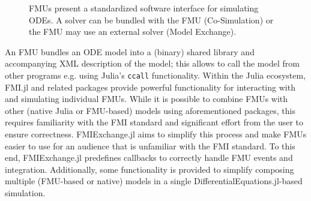 \documentclass{juliacon}
\begin{document}
\begin{figure}
  \center
{}
\caption{FMUs present a standardized software interface for simulating ODEs. A solver can be bundled with the FMU (Co-Simulation) or the FMU may use an external solver (Model Exchange).}
\label{fig:FMU}
\end{figure}

An FMU bundles an ODE model into a (binary) shared library and accompanying XML description of the model; this allows to call the model from other programs e.g. using Julia's \texttt{ccall} functionality.
Within the Julia ecosystem, FMI.jl and related packages \cite{thummerer2021} provide powerful functionality for interacting with and simulating individual FMUs.
While it is possible to combine FMUs with other (native Julia or FMU-based) models using aforementioned packages, this requires familiarity with the FMI standard and significant effort from the user to ensure correctness.
FMIExchange.jl aims to simplify this process and make FMUs easier to use for an audience that is unfamiliar with the FMI standard.
To this end, FMIExchange.jl predefines callbacks to correctly handle FMU events and integration.
Additionally, some functionality is provided to simplify composing multiple (FMU-based or native) models in a single DifferentialEquations.jl-based simulation.
\end{document}
